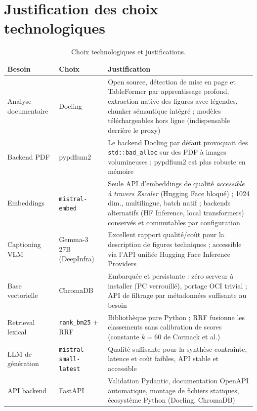 
\section{Justification des choix technologiques}
\label{sec:choix-technos}

\begin{table}[!htb]
\centering\small
\caption{Choix technologiques et justifications.}
\label{tab:choix}
\begin{tabularx}{\textwidth}{@{}p{3.1cm}p{3.4cm}X@{}}
\toprule
\textbf{Besoin} & \textbf{Choix} & \textbf{Justification} \\
\midrule
Analyse documentaire & Docling & Open source, détection de mise en page et TableFormer par apprentissage profond, extraction native des figures avec légendes, chunker sémantique intégré ; modèles téléchargeables hors ligne (indispensable derrière le proxy) \\
Backend PDF & pypdfium2 & Le backend Docling par défaut provoquait des \texttt{std::bad\_alloc} sur des PDF à images volumineuses ; pypdfium2 est plus robuste en mémoire \\
Embeddings & \texttt{mistral-embed} & Seule API d'embeddings de qualité \emph{accessible à travers Zscaler} (Hugging Face bloqué) ; 1024 dim., multilingue, batch natif ; backends alternatifs (HF Inference, local transformers) conservés et commutables par configuration \\
Captioning VLM & Gemma-3 27B (DeepInfra) & Excellent rapport qualité/coût pour la description de figures techniques ; accessible via l'API unifiée Hugging Face Inference Providers \\
Base vectorielle & ChromaDB & Embarquée et persistante : zéro serveur à installer (PC verrouillé), portage OCI trivial ; API de filtrage par métadonnées suffisante au besoin \\
Retrieval lexical & \texttt{rank\_bm25} + RRF & Bibliothèque pure Python ; RRF fusionne les classements sans calibration de scores (constante $k=60$ de Cormack et al.) \\
LLM de génération & \texttt{mistral-small-latest} & Qualité suffisante pour la synthèse contrainte, latence et coût faibles, API stable et accessible \\
API backend & FastAPI & Validation Pydantic, documentation OpenAPI automatique, montage de fichiers statiques, écosystème Python (Docling, ChromaDB) \\

\end{tabularx}
\end{table}

